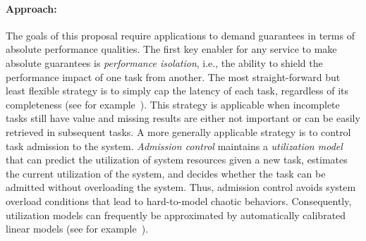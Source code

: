 

\paragraph{Approach:}
The goals of this proposal require applications to demand guarantees in terms
of absolute performance qualities.  The first key enabler for any service to
make absolute guarantees is \emph{performance isolation}, i.e., the ability to
shield the performance impact of one task from another. The most
straight-forward but least flexible strategy is to simply cap the latency of
each task, regardless of its completeness (see for
example~\cite{decandia:sosp07}). This strategy is applicable when incomplete
tasks still have value and missing results are either not important or can be
easily retrieved in subsequent tasks. A more generally applicable strategy is
to control task admission to the system. \emph{Admission control} maintains a
\emph{utilization model} that can predict the utilization of system
resources given a new task, estimates the current utilization of the system,
and decides whether the task can be admitted without overloading the system.
Thus, admission control avoids system overload conditions that lead to
hard-to-model chaotic behaviors.  Consequently, utilization models can
frequently be approximated by automatically calibrated linear models (see for
example~\cite{skourtis:hpdc12}).

